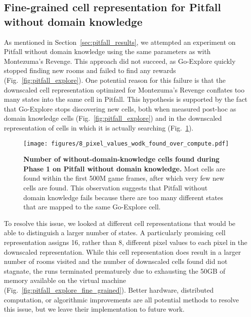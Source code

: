 \documentclass{article}
\begin{document}
\FloatBarrier


\subsection{Fine-grained cell representation for Pitfall without domain knowledge}
\label{sec:pitfall_cell_representation}

As mentioned in Section~\ref{sec:pitfall_results}, we attempted an experiment on Pitfall without domain knowledge using the same parameters as with Montezuma's Revenge. This approach did not succeed, as Go-Explore quickly stopped finding new rooms and failed to find any rewards (Fig.~\ref{fig:pitfall_explore}). One potential reason for this failure is that the downscaled cell representation optimized for Montezuma's Revenge conflates too many states into the same cell in Pitfall. This hypothesis is supported by the fact that Go-Explore stops discovering new cells, both when measured post-hoc as domain knowledge cells (Fig.~\ref{fig:pitfall_explore}) and in the downscaled representation of cells in which it is actually searching (Fig.~\ref{fig:pitfall_cells_found_stagnation}).

\begin{figure}[tbh]
    \centering
    \texttt{[image: figures/8\_pixel\_values\_wodk\_found\_over\_compute.pdf]}
    \caption{\textbf{Number of without-domain-knowledge cells found during Phase 1 on Pitfall without domain knowledge.} Most cells are found within the first 500M game frames, after which very few new cells are found. This observation suggests that Pitfall without domain knowledge fails because there are too many different states that are mapped to the same Go-Explore cell.}
    \label{fig:pitfall_cells_found_stagnation}
\end{figure}

To resolve this issue, we looked at different cell representations that would be able to distinguish a larger number of states. A particularly promising cell representation assigns 16, rather than 8, different pixel values to each pixel in the  downscaled representation. While this cell representation does result in a larger number of rooms visited and the number of downscaled cells found did not stagnate, the runs terminated prematurely due to exhausting the 50GB of memory available on the virtual machine (Fig.~\ref{fig:pitfall_explore_fine_grained}). Better hardware, distributed computation, or algorithmic improvements are all potential methods to resolve this issue, but we leave their implementation to future work.
\end{document}
